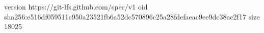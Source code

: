version https://git-lfs.github.com/spec/v1
oid sha256:e516df059511c950a23521fb6a52dc570896c25a28fdefaeac9ee9dc38ac2f17
size 18025
